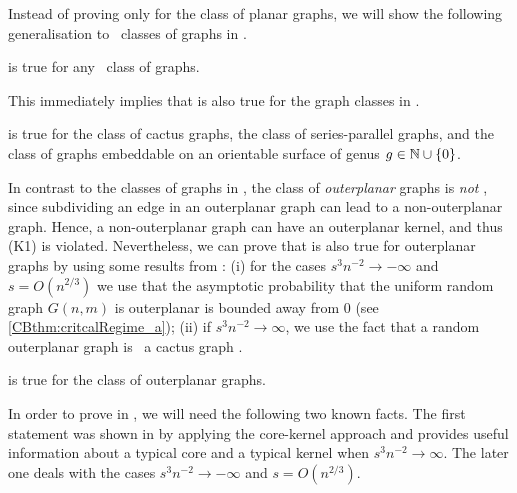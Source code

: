 Instead of proving  only for the class of planar graphs, we will show the following generalisation to \pl\ classes of graphs in . 
\begin{thm}\label{CBthm:general}
 is true for any \pl\ class of graphs.
\end{thm}

This immediately implies that  is also true for the graph classes in .
\begin{coro}\label{CBcoro:general}
	 is true for the class of cactus graphs, the class of series-parallel graphs, and the class of graphs embeddable on an orientable surface of genus $g \in \mathbb{N}\cup\{0\}$.
\end{coro}
In contrast to the classes of graphs in , the class of {\em outerplanar} graphs is {\em not} \pl, since subdividing an edge in an outerplanar graph can lead to a non-outerplanar graph. Hence, a non-outerplanar graph can have an outerplanar kernel, and thus (K1) is violated. Nevertheless, we can prove that  is also true for outerplanar graphs by using some results from \cite{KangMissethan2020}: (i) for the cases $s^3 n^{-2} \to -\infty$ and $s=O\left(n^{2/3}\right)$ we use that the asymptotic probability that the uniform random graph $G(n,m)$ is outerplanar is bounded away from 0 (see \ref{CBthm:critcalRegime_a}); (ii) if $s^3n^{-2}\to \infty$, we use the fact that a random outerplanar graph is \whp\ a cactus graph \cite[Theorem 4]{KangMissethan2020}.
\begin{coro}\label{CBcoro:outerplanar}
	 is true for the class of outerplanar graphs.
\end{coro}

In order to prove  in , we will need the following two known facts. The first statement was shown in \cite{KangMosshammerSpruessel2020} by applying the core-kernel approach and provides useful information about a typical core and a typical kernel when $s^3n^{-2} \to \infty$. The later one deals with the cases $s^3n^{-2} \to -\infty$ and $s=O\left(n^{2/3}\right)$.


